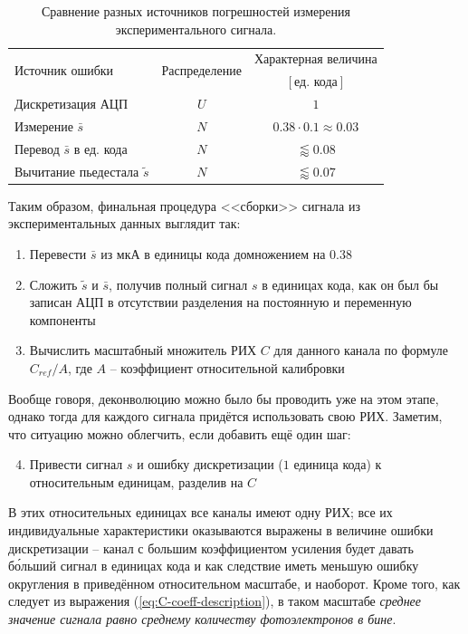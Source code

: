 \documentclass[12pt]{book}
\begin{document}
	\begin{table}
		\centering
		\begin{tabular}{ |l|c|c| }
			\toprule
			\multirow{2}{*}{Источник ошибки} & \multirow{2}{*}{Распределение}
			 & Характерная величина \\
			& & $[\text{ед. кода}]$ \\
			\midrule
			Дискретизация АЦП & $U$ & $1$ \\ 
			Измерение $\bar{s}$ & $N$ & $0.38 \cdot 0.1 \approx 0.03$ \\ 
			Перевод $\bar{s}$ в ед. кода & $N$ & $\lessapprox 0.08$ \\ 
			Вычитание пьедестала $\tilde{s}$ & $N$ & $\lessapprox 0.07$ \\ 
			\bottomrule
		\end{tabular}
		\caption{\label{tab:s-measurement-errors}Сравнение разных источников погрешностей измерения экспериментального сигнала.}
	\end{table}

	Таким образом, финальная процедура <<сборки>> сигнала из экспериментальных данных выглядит так:
	
	\begin{enumerate}
		\item Перевести $\bar{s}$ из мкА в единицы кода домножением на $0.38$
		\item Сложить $\tilde{s}$ и $\bar{s}$, получив полный сигнал $s$ в единицах кода, как он был бы записан АЦП в отсутствии разделения на постоянную и переменную компоненты
		\item Вычислить масштабный множитель РИХ $C$ для данного канала по формуле $C_{ref} / A$, где $A$ -- коэффициент относительной калибровки
	\end{enumerate}

	Вообще говоря, деконволюцию можно было бы проводить уже на этом этапе, однако тогда для каждого сигнала придётся использовать свою РИХ. Заметим, что ситуацию можно облегчить, если добавить ещё один шаг:
	
	\begin{enumerate}
		\setcounter{enumi}{3}
		\item Привести сигнал $s$ и ошибку дискретизации ($1$ единица кода) к относительным единицам, разделив на $C$
	\end{enumerate}

	В этих относительных единицах все каналы имеют одну РИХ; все их индивидуальные характеристики оказываются выражены в величине ошибки дискретизации -- канал с большим коэффициентом усиления будет давать б\'{о}льший сигнал в единицах кода и как следствие иметь меньшую ошибку округления в приведённом относительном масштабе, и наоборот. Кроме того, как следует из выражения (\ref{eq:C-coeff-description}), в таком масштабе \textit{среднее значение сигнала равно среднему количеству фотоэлектронов в бине}.
	
\end{document}
